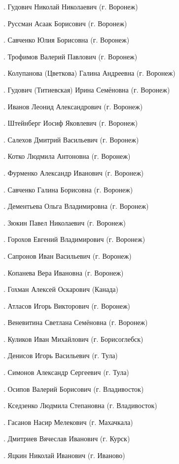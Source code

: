 .	Гудович Николай Николаевич (г. Воронеж)

.	Руссман Асаак Борисович (г. Воронеж)

.	Савченко Юлия Борисовна (г. Воронеж)

.	Трофимов Валерий Павлович (г. Воронеж)

.	Колупанова (Цветкова) Галина Андреевна (г. Воронеж)

.	Гудович (Титиевская) Ирина Семёновна (г. Воронеж)

.	Иванов Леонид Александрович (г. Воронеж)

.	Штейнберг Иосиф Яковлевич (г. Воронеж)

.	Салехов Дмитрий Васильевич (г. Воронеж)

.	Котко Людмила Антоновна (г. Воронеж)

.	Фурменко Александр Иванович (г. Воронеж)

.	Савченко Галина Борисовна (г. Воронеж)

.	Дементьева Ольга Владимировна (г. Воронеж)

.	Зюкин Павел Николаевич (г. Воронеж)

.	Горохов Евгений Владимирович (г. Воронеж)

.	Сапронов Иван Васильевич (г. Воронеж)

.	Копанева Вера Ивановна (г. Воронеж)

.	Гохман Алексей Оскарович (Канада)

.	Атласов Игорь Викторович (г. Воронеж)

.	Веневитина Светлана Семёновна (г. Воронеж)

.	Куликов Иван Михайлович (г. Борисоглебск)

.	Денисов Игорь Васильевич (г. Тула)

.	Симонов Александр Сергеевич (г. Тула)

.	Осипов Валерий Борисович (г. Владивосток)

.	Кседзенко Людмила Степановна (г. Владивосток)

.	Гасанов Насир Мелекович (г. Махачкала)

.	Дмитриев Вячеслав Иванович (г. Курск)

.	Яцкин Николай Иванович (г. Иваново)

